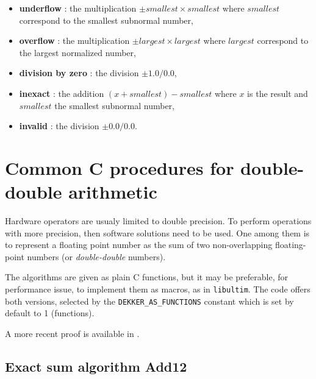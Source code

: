 \begin{itemize}
\item {\bf underflow} : the multiplication $\pm smallest \times smallest$ where $smallest$ correspond to the smallest subnormal number,
\item {\bf overflow} : the multiplication  $\pm largest \times largest$ where $largest$ correspond to the largest normalized number,
\item {\bf division by zero} : the division $\pm 1.0/0.0$,
\item {\bf inexact} : the addition $(x + smallest) - smallest$ where $x$ is the result and  $smallest$ the smallest subnormal number,
\item {\bf invalid} : the division $\pm 0.0/0.0$.
\end{itemize}








\section{Common C procedures for double-double arithmetic\label{section:commonCdoubledouble}}
Hardware operators are usualy limited to double precision. To perform
operations with more precision, then software solutions need to be
used. One among them is to represent a floating point number as the
sum of two non-overlapping floating-point numbers (or
\emph{double-double} numbers). 

The algorithms are given as plain C functions, but it may be
preferable, for performance issue, to implement them as macros, as in
\texttt{libultim}.  The code offers both versions,
selected by the \texttt{DEKKER\_AS\_FUNCTIONS} constant which is set
by default to 1 (functions).

A more recent proof is available in \cite{Lau05}.

\subsection{Exact sum algorithm {Add12}}

